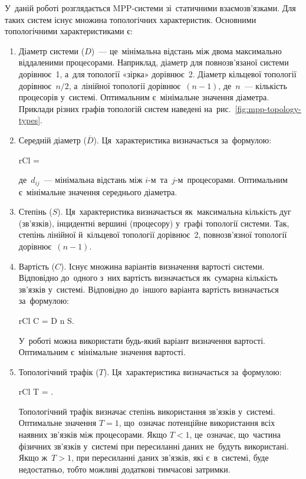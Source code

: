 \documentclass[
	a4paper,
	oneside,
	BCOR = 10mm,
	DIV = 12,
	12pt,
	headings = normal,
]{scrartcl}
\begin{document}
		У~даній роботі розглядається \textenglish{MPP}-системи зі~статичними взаємозв'язками. Для таких систем існує множина топологічних характеристик. Основними топологічними характеристиками є: 
		\begin{enumerate}
			\item Діаметр системи ($D$)~— це~мінімальна відстань між двома максимально віддаленими процесорами. Наприклад, діаметр для повнозв’язаної системи дорівнює~1, а~для топології «зірка» дорівнює~2. Діаметр кільцевої топології дорівнює~$n/2$, а~лінійної топології дорівнює~$(n - 1)$, де~$n$~— кількість процесорів у~системі. Оптимальним є~мінімальне значення діаметра. Приклади різних графів топологій систем наведені на~рис.~\ref{fig:mpp-topology-types}.
			\item Середній діаметр ($\overline{D}$). Ця~характеристика визначається за~формулою:
				\begin{IEEEeqnarray}{rCl}
					 = 
				\end{IEEEeqnarray}
				де~$d_{ij}$~— мінімальна відстань між $i$-м~та~$j$-м~процесорами. Оптимальним є~мінімальне значення середнього діаметра.
			\item Степінь ($S$). Ця~характеристика визначається як~максимальна кількість дуг (зв'язків), інцидентні вершині (процесору) у~графі топології системи. Так, степінь лінійної й~кільцевої топології дорівнює~2, повнозв’язної топології дорівнює~$(n - 1)$.
			\item Вартість ($C$). Існує множина варіантів визначення вартості системи. Відповідно до~одного з~них вартість визначається як~сумарна кількість зв'язків у~системі. Відповідно до~іншого варіанта вартість визначається за~формулою:
				\begin{IEEEeqnarray}{rCl}
					C = D n S.
				\end{IEEEeqnarray}
				У~роботі можна використати будь-який варіант визначення вартості. Оптимальним є~мінімальне значення вартості.
			\item Топологічний трафік ($T$).	Ця~характеристика визначається за~формулою:
				\begin{IEEEeqnarray}{rCl}
					T = \frac{2 \overline{D}}{S}.
				\end{IEEEeqnarray}
				Топологічний трафік визначає степінь використання зв'язків у~системі. Оптимальне значення $T = 1$, що~означає потенційне використання всіх наявних зв'язків між процесорами. Якщо $T < 1$, це~означає, що~частина фізичних зв'язків у~системі при пересиланні даних не~будуть використані. Якщо ж~$T > 1$, при пересиланні даних зв'язків, які є~в~системі, буде недостатньо, тобто можливі додаткові тимчасові затримки.
		\end{enumerate}
\end{document}
